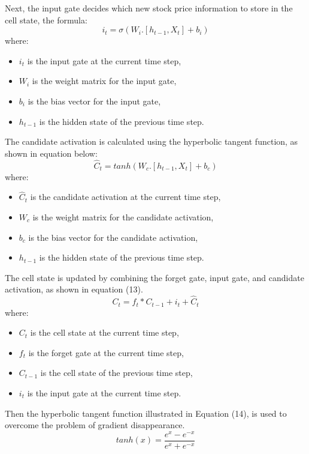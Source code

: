 \documentclass{ieeeojies}
\begin{document}
Next, the input gate decides which new stock price information to store in the cell state, the formula:
\begin{equation}
    i_t = \sigma(W_i.[h_{t-1}, X_t] + b_i)
\end{equation}
where:
\begin{itemize}
    \item $i_t$ is the input gate at the current time step,
    \item $W_i$ is the weight matrix for the input gate,
    \item $b_i$ is the bias vector for the input gate,
    \item $h_{t-1}$ is the hidden state of the previous time step.
\end{itemize}

The candidate activation is calculated using the hyperbolic tangent function, as shown in equation below:
\begin{equation}
    \hat{C}_t = tanh(W_c.[h_{t-1}, X_t] + b_c)
\end{equation}
where:
\begin{itemize}
    \item $\hat{C}_t$ is the candidate activation at the current time step,
    \item $W_c$ is the weight matrix for the candidate activation,
    \item $b_c$ is the bias vector for the candidate activation,
    \item $h_{t-1}$ is the hidden state of the previous time step.
\end{itemize}

The cell state is updated by combining the forget gate, input gate, and candidate activation, as shown in equation (13).
\begin{equation}
    C_t = f_t*C_{t-1} + i_t + \hat{C}_t
\end{equation}
where:
\begin{itemize}
    \item $C_t$ is the cell state at the current time step,
    \item $f_t$ is the forget gate at the current time step,
    \item $C_{t-1}$ is the cell state of the previous time step,
    \item $i_t$ is the input gate at the current time step.
\end{itemize}

Then the hyperbolic tangent function illustrated in Equation (14), is used to overcome the problem of gradient disappearance.
\begin{equation}
    tanh(x) = \frac{e^x - e^{-x}}{e^x + e^{-x}}
\end{equation}
\end{document}
